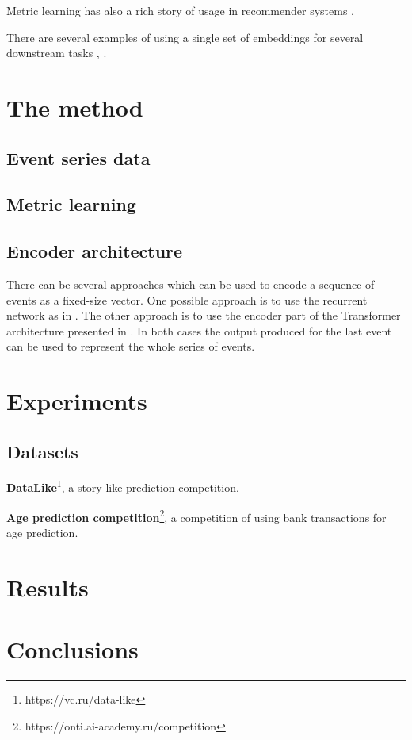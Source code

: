 \documentclass[sigconf]{acmart}
\begin{document}
Metric learning has also a rich story of usage in recommender systems \cite{Hsieh:2017:CML:3038912.3052639}.

There are several examples of using a single set of embeddings for several downstream tasks \cite{Song2017LearningUE}, \cite{Zhai:2019:LUE:3292500.3330739}.

\section{The method}

\subsection{Event series data}

\subsection{Metric learning}

\subsection{Encoder architecture}

There can be several approaches which can be used to encode a sequence of events as a fixed-size vector. One possible approach is to use the recurrent network as in \cite{Sutskever:2014:SSL:2969033.2969173}. The other approach is to use the encoder part of the Transformer architecture presented in \cite{DBLP:journals/corr/VaswaniSPUJGKP17}. In both cases the output produced for the last event can be used to represent the whole series of events.

\section{Experiments} \label{sec-exp}


\subsection{Datasets} \label{sec-datasets}

\textbf{DataLike}\footnote{https://vc.ru/data-like}, a story like prediction competition.

\textbf{Age prediction competition}\footnote{https://onti.ai-academy.ru/competition}, a competition of using bank transactions for age prediction.

\section{Results}

\section{Conclusions}



\end{document}
